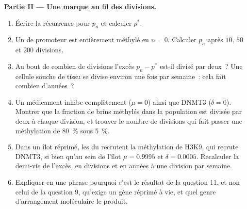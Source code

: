 \begin{problem}
\medskip
\noindent\textbf{Partie II --- Une marque au fil des divisions.}
\begin{enumerate}[resume]
  \item Écrire la récurrence pour $p_{n}$ et calculer $p^{*}$.
  \item Un  de promoteur est entièrement méthylé en $n = 0$.
        Calculer $p_{n}$ après $10$, $50$ et $200$ divisions.
  \item Au bout de combien de divisions l'excès $p_{n} - p^{*}$ est-il
        divisé par deux~? Une cellule souche de tissu se divise environ
        une fois par semaine~: cela fait combien d'années~?
  \item Un médicament inhibe complètement  ($\mu = 0$) ainsi que
        DNMT3 ($\delta = 0$). Montrer que la fraction de brins méthylés
        dans la population est divisée par deux à chaque division, et
        trouver le nombre de divisions qui fait passer une méthylation
        de \qty{80}{\%} sous \qty{5}{\%}.
  \item Dans un îlot réprimé, les  du  recrutent la
        méthylation de H3K9, qui recrute DNMT3, si bien qu'au sein de
        l'îlot $\mu = 0.9995$ et $\delta = 0.0005$. Recalculer la
        demi-vie de l'excès, en divisions et en années à une division
        par semaine.
  \item Expliquer en une phrase pourquoi c'est le résultat de la
        question 11, et non celui de la question 9, qu'exige un gène
        réprimé à vie, et quel genre d'arrangement moléculaire le
        produit.
\end{enumerate}


\end{problem}
